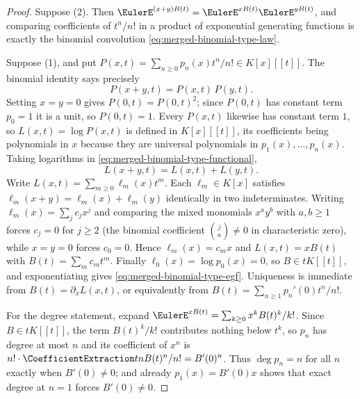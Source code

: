 \documentclass[11pt,a4paper,oneside,openany]{book}
\theoremstyle{definition}
\theoremstyle{remark}
\begin{document}
\begin{proof}
Suppose (2).  Then
$\EulerE^{(x+y)B(t)}=\EulerE^{xB(t)}\EulerE^{yB(t)}$, and comparing
coefficients of $t^n/n!$ in a product of exponential generating functions is
exactly the binomial convolution \eqref{eq:merged-binomial-type-law}.

Suppose (1), and put $P(x,t)=\sum_{n\geq0}p_n(x)t^n/n!\in K[x][[t]]$.  The
binomial identity says precisely
\begin{equation}
 P(x+y,t)=P(x,t)\,P(y,t).                                          \label{eq:merged-binomial-type-functional}
\end{equation}
Setting $x=y=0$ gives $P(0,t)=P(0,t)^2$; since $P(0,t)$ has constant term
$p_0=1$ it is a unit, so $P(0,t)=1$.  Every $P(x,t)$ likewise has constant
term $1$, so $L(x,t)=\log P(x,t)$ is defined in $K[x][[t]]$, its coefficients
being polynomials in $x$ because they are universal polynomials in
$p_1(x),\ldots,p_n(x)$.  Taking logarithms in
\eqref{eq:merged-binomial-type-functional},
\[
 L(x+y,t)=L(x,t)+L(y,t).
\]
Write $L(x,t)=\sum_{m\geq0}\ell_m(x)t^m$.  Each $\ell_m\in K[x]$ satisfies
$\ell_m(x+y)=\ell_m(x)+\ell_m(y)$ identically in two indeterminates.  Writing
$\ell_m(x)=\sum_jc_jx^j$ and comparing the mixed monomials $x^ay^b$ with
$a,b\geq1$ forces $c_j=0$ for $j\geq2$ (the binomial coefficient
$\binom ja\ne0$ in characteristic zero), while $x=y=0$ forces $c_0=0$.  Hence
$\ell_m(x)=c_mx$ and $L(x,t)=xB(t)$ with $B(t)=\sum_mc_mt^m$.  Finally
$\ell_0(x)=\log p_0(x)=0$, so $B\in tK[[t]]$, and exponentiating gives
\eqref{eq:merged-binomial-type-egf}.  Uniqueness is immediate from
$B(t)=\partial_xL(x,t)$, or equivalently from $B(t)=\sum_{n\geq1}p_n'(0)t^n/n!$.

For the degree statement, expand
$\EulerE^{xB(t)}=\sum_{k\geq0}x^kB(t)^k/k!$.  Since $B\in tK[[t]]$, the term
$B(t)^k/k!$ contributes nothing below $t^k$, so $p_n$ has degree at most $n$
and its coefficient of $x^n$ is $n!\cdot\CoefficientExtraction tn B(t)^n/n!=B'(0)^n$.
Thus $\deg p_n=n$ for all $n$ exactly when $B'(0)\ne0$; and already
$p_1(x)=B'(0)x$ shows that exact degree at $n=1$ forces $B'(0)\ne0$.
\end{proof}
\end{document}
